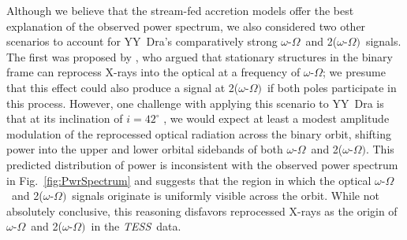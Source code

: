 \documentclass[twocolumn]{aastex63}
\newcommand{\orbit}{$\Omega$}
\newcommand{\spin}{$\omega$}
\newcommand{\beat}{$\omega$-$\Omega$}
\newcommand{\doublebeat}{2($\omega$-$\Omega)$}
\newcommand{\TESS}{\textit{TESS}}
\begin{document}






Although we believe that the \citet{Ferrario99} stream-fed accretion models offer the best explanation of the observed power spectrum, we also considered two other scenarios to account for YY~Dra's comparatively strong \beat\ and \doublebeat\ signals. The first was proposed by \citet{warner86}, who argued that stationary structures in the binary frame can reprocess X-rays into the optical at a frequency of \beat; we presume that this effect could also produce a signal at \doublebeat\ if both poles participate in this process. However, one challenge with applying this scenario to YY~Dra is that at its inclination of $i=42^{\circ}$ \citep{Matteo91}, we would expect at least a modest amplitude modulation of the reprocessed optical radiation across the binary orbit, shifting power into the upper and lower orbital sidebands of both \beat\ and \doublebeat \citep{warner86}. This predicted distribution of power is inconsistent with the observed power spectrum in Fig.~\ref{fig:PwrSpectrum} and suggests that the region in which the optical \beat\ and \doublebeat\ signals originate is uniformly visible across the orbit. While not absolutely conclusive, this reasoning disfavors reprocessed X-rays as the origin of \beat\ and \doublebeat\ in the \TESS\ data.
\end{document}
